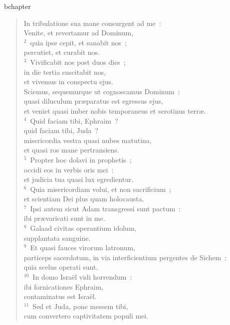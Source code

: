 bchapter\begin{flushleft}\begin{verse}\vspace{-19pt}In tribulatione sua mane consurgent ad me~:\\ Venite, et revertamur ad Dominum,\\
${}^{2}$~quia ipse cepit, et sanabit nos~;\\ percutiet, et curabit nos.\\
${}^{3}$~Vivificabit nos post duos dies~;\\ in die tertia suscitabit nos,\\ et vivemus in conspectu ejus.\\ Sciemus, sequemurque ut cognoscamus Dominum~:\\ quasi diluculum pr\ae paratus est egressus ejus,\\ et veniet quasi imber nobis temporaneus et serotinus terr\ae .\\
${}^{4}$~Quid faciam tibi, Ephraim~?\\ quid faciam tibi, Juda~?\\ misericordia vestra quasi nubes matutina,\\ et quasi ros mane pertransiens.\\
${}^{5}$~Propter hoc dolavi in prophetis~;\\ occidi eos in verbis oris mei~:\\ et judicia tua quasi lux egredientur.\\
${}^{6}$~Quia misericordiam volui, et non sacrificium~;\\ et scientiam Dei plus quam holocausta.\\
${}^{7}$~Ipsi autem sicut Adam transgressi sunt pactum~:\\ ibi pr\ae varicati sunt in me.\\
${}^{8}$~Galaad civitas operantium idolum,\\ supplantata sanguine.\\
${}^{9}$~Et quasi fauces virorum latronum,\\ particeps sacerdotum, in via interficientium pergentes de Sichem~:\\ quia scelus operati sunt.\\
${}^{10}$~In domo Isra\"el vidi horrendum~:\\ ibi fornicationes Ephraim,\\ contaminatus est Isra\"el.\\
${}^{11}$~Sed et Juda, pone messem tibi,\\ cum convertero captivitatem populi mei.\end{verse}\end{flushleft}


